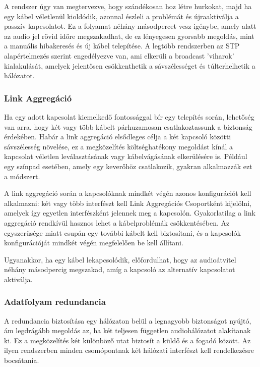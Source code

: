 A rendszer úgy van megtervezve, hogy szándékosan hoz létre hurkokat, 
majd ha egy kábel véletlenül kioldódik, azonnal észleli a problémát és 
újraaktiválja a passzív kapcsolatot. Ez a folyamat néhány másodpercet 
vesz igénybe, amely alatt az audio jel rövid időre megszakadhat, de ez 
lényegesen gyorsabb megoldás, mint a manuális hibakeresés és új kábel telepítése. 
A legtöbb rendszerben az STP alapértelmezés szerint engedélyezve van, ami 
elkerüli a broadcast 'viharok' kialakulását, amelyek jelentősen csökkenthetik a 
sávszélességet és túlterhelhetik a hálózatot.

\subsubsection{Link Aggregáció}
Ha egy adott kapcsolat kiemelkedő fontossággal bír egy telepítés során, lehetőség 
van arra, hogy két vagy több kábelt párhuzamosan csatlakoztassunk a biztonság érdekében. 
Habár a link aggregáció elsődleges célja a két kapcsoló közötti sávszélesség növelése, 
ez a megközelítés költséghatékony megoldást kínál a kapcsolat véletlen leválasztásának 
vagy kábelvágásának elkerülésére is. Például egy színpad esetében, amely egy keverőhöz 
csatlakozik, gyakran alkalmazzák ezt a módszert.

A link aggregáció során a kapcsolóknak mindkét végén azonos 
konfigurációt kell alkalmazni: két vagy több interfészt kell Link Aggregációs Csoportként 
kijelölni, amelyek így egyetlen interfészként jelennek meg a kapcsolón. Gyakorlatilag a link 
aggregáció rendkívül hasznos lehet a kábelproblémák csökkentésében. 
Az egyszerűsége miatt csupán egy további kábelt kell biztosítani, és a 
kapcsolók konfigurációját mindkét végén megfelelően be kell állítani.

Ugyanakkor, ha egy kábel lekapcsolódik, előfordulhat, hogy az audioátvitel néhány másodpercig megszakad, 
amíg a kapcsoló az alternatív kapcsolatot aktiválja.
\subsubsection{ Adatfolyam redundancia}
A redundancia biztosítása egy hálózaton belül a legnagyobb biztonságot nyújtó, ám 
legdrágább megoldás az, ha két teljesen független audiohálózatot alakítanak ki. 
Ez a megközelítés két különböző utat biztosít a küldő és a fogadó között. 
Az ilyen rendszerben minden csomópontnak két hálózati interfészt kell rendelkezésre bocsátania.

